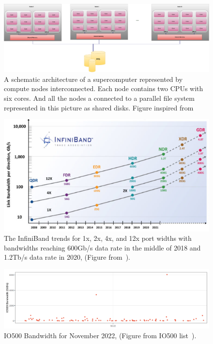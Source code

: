 \begin{figure}[tb]\centering
\includegraphics[scale=0.25]{figures/supercomputer.pdf}
\caption{A schematic architecture of a supercomputer represented by compute nodes interconnected. Each node contains two CPUs with six cores. And all the nodes a connected to a parallel file system represented in this picture as shared disks. Figure inspired from~\cite{yan_comparison_2018}}
\label{figarchisuper}
\end{figure}

\begin{figure}[ht]\centering
\includegraphics[scale=0.5]{figures/infiniband.png}
\caption{The InfiniBand trends for 1x, 2x, 4x, and 12x port widths with bandwidths reaching 600Gb/s data rate in the middle of 2018 and 1.2Tb/s data rate in 2020, (Figure from~\cite{infiniband}).}
\label{figinfiniband}
\end{figure}


\begin{figure}[ht]\centering
\includegraphics[scale=0.3]{figures/top500.db.png}
\caption{IO500 Bandwidth for November 2022, (Figure from IO500 list~\cite{io500}).}
\label{figioBW}
\end{figure}

